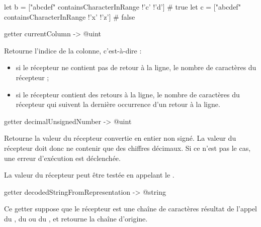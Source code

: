 \begin{galgas}
let b = ["abcdef" containsCharacterInRange !'c' !'d'] # true
let c = ["abcdef" containsCharacterInRange !'x' !'z'] # false
\end{galgas}







\begin{galgasbox}
getter currentColumn -> @uint
\end{galgasbox}

Retourne l'indice de la colonne, c'est-à-dire :
\begin{itemize}
\item si le récepteur ne contient pas de retour à la ligne, le nombre de caractères du récepteur ;
\item si le récepteur contient des retours à la ligne, le nombre de caractères du récepteur qui suivent la dernière occurrence d'un retour à la ligne.
\end{itemize}








\begin{galgasbox}
getter decimalUnsignedNumber -> @uint
\end{galgasbox}

Retourne la valeur du récepteur convertie en entier non signé. La valeur du récepteur doit donc ne contenir que des chiffres décimaux. Si ce n'est pas le cas, une erreur d'exécution est déclenchée.

La valeur du récepteur peut être testée en appelant le .








\begin{galgasbox}
getter decodedStringFromRepresentation -> @string
\end{galgasbox}

Ce getter suppose que le récepteur est une chaîne de caractères résultat de l'appel du , du  ou du , et retourne la chaîne d'origine.

